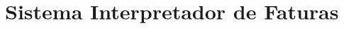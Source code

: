 \chapter{Sistema Interpretador de Faturas} 
\label{c:sistema_interpretador_de_faturas}
\lipsum[10-13]